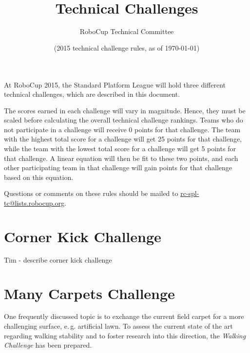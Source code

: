 \documentclass[12pt]{article}
\title{\leaguename \\ Technical Challenges}
\author{RoboCup Technical Committee}
\date{(2015 technical challenge rules, as of \today)}
\newcommand{\eg}{\mbox{e.\,g.}\xspace}
\begin{document}
\maketitle

At RoboCup 2015, the Standard Platform League will hold three different technical challenges, which are described in this document.

The scores earned in each challenge will vary in magnitude.  Hence, they must be scaled before calculating the overall technical challenge rankings.  Teams who do not participate in a challenge will receive 0 points for that challenge.  The team with the highest total score for a challenge will get 25 points for that challenge, while the team with the lowest total score for a challenge will get 5 points for that challenge.  A linear equation will then be fit to these two points, and each other participating team in that challenge will gain points for that challenge based on this equation.

Questions or comments on these rules should be mailed to {\small \url{rc-spl-tc@lists.robocup.org}}.

\vfill

\renewcommand\contentsname{Challenges}
\tableofcontents
\setcounter{tocdepth}{1}

\thispagestyle{fancy}

\clearpage

\cfoot{\thepage}
\setcounter{page}{1}

\newcommand{\openMinNum}{three}




\section{Corner Kick Challenge}

Tim - describe corner kick challenge

\newpage






\section{Many Carpets Challenge}
One frequently discussed topic is to exchange the current field carpet for a more challenging surface, \eg artificial lawn.
To assess the current state of the art regarding walking stability and to foster research into this direction, the \textit{Walking Challenge} has been prepared.
\end{document}
